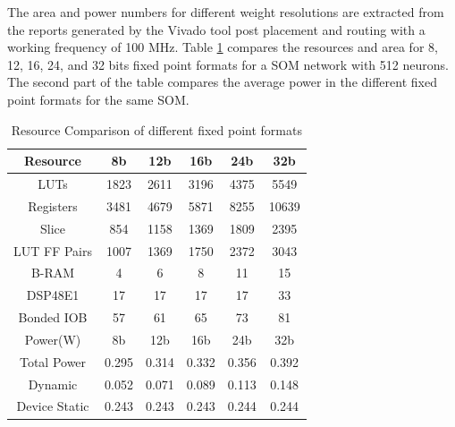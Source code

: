\documentclass[a4paper,10pt]{article}
\begin{document}
The area and power numbers for different weight resolutions are extracted from the reports generated by the Vivado tool post placement and routing with a working frequency of 100 MHz. Table \ref{table:1} compares the resources and area for 8, 12, 16, 24, and 32 bits fixed point formats for a SOM network with 512 neurons. The second part of the table compares the average power in the different fixed point formats for the same SOM.
\begin{table}[!htb]
	\centering
	\caption{Resource Comparison of different fixed point formats}
	\label{table:1}
	\begin{tabular}{ c |c | c| c |c | c } 
		\toprule
		Resource & 8b & 12b & 16b & 24b & 32b \\ 
		\midrule
		LUTs & 1823 & 2611 &3196 & 4375 & 5549 \\
		\hline
		Registers & 3481 & 4679 & 5871 & 8255 & 10639 \\ 
		\hline
		Slice & 854 & 1158 & 1369 &1809 & 2395 \\ 
		\hline
		LUT FF Pairs & 1007 & 1369 & 1750 & 2372 & 3043 \\
		\hline
		B-RAM & 4 & 6 & 8 & 11 & 15 \\
		\hline
		DSP48E1 & 17 & 17 & 17 & 17 & 33 \\
		\hline
		Bonded IOB & 57 & 61 & 65 & 73 & 81 \\
		\midrule
	
		\midrule
		Power(W) & 8b & 12b & 16b & 24b & 32b \\ 
		\midrule
		Total Power & 0.295 &0.314 &0.332 &0.356 &0.392 \\
		\hline
		Dynamic &0.052 &0.071 &0.089 &0.113 &0.148 \\ 
		\hline
		Device Static &0.243 &0.243 &0.243 &0.244 &0.244 \\ 
		\bottomrule
	\end{tabular}
\end{table}
\end{document}
